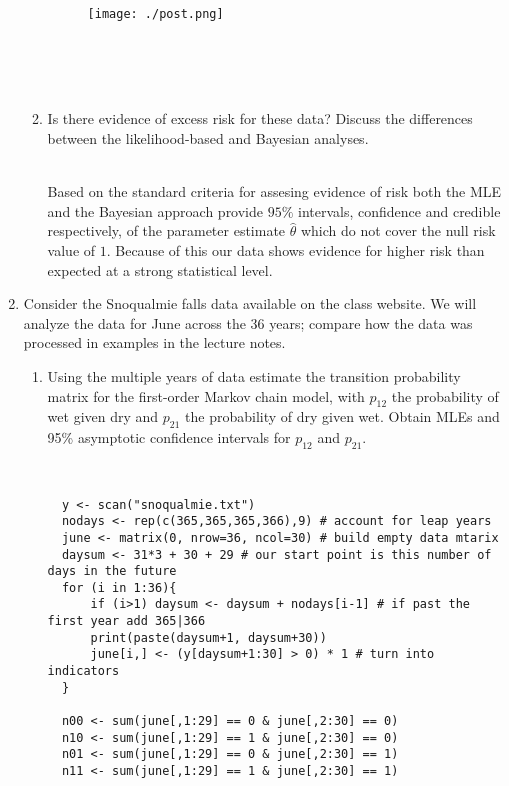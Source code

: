 \documentclass{article} %
\begin{document}
\begin{enumerate}
\begin{enumerate}
\begin{figure}[h!t]
\centerline{
	\texttt{[image: ./post.png]}
}
\end{figure}

~ \\
~ \\
~ \\

\item Is there evidence of excess risk for these data? Discuss the differences between the likelihood-based and Bayesian analyses.

~ \\
Based on the standard criteria for assesing evidence of risk both the MLE and
the Bayesian approach provide $95\%$ intervals, confidence and credible respectively,
of the parameter estimate $\hat{\theta}$ which do not cover the null risk value
of $1$. Because of this our data shows evidence for higher risk than
expected at a strong statistical level.

\end{enumerate}
\item Consider the Snoqualmie falls data available on the class
  website.
  We will analyze the
  data for June across the 36 years; compare how the data was
  processed in examples in the lecture notes.
\begin{enumerate}
\item Using the multiple years of data estimate the transition
  probability matrix for the first-order Markov chain model, with
  $p_{12}$
  the probability of wet given dry and $p_{21}$
  the probability of dry given wet.  Obtain MLEs and 95\% asymptotic
  confidence intervals for $p_{12}$ and $p_{21}$.

~ \\

\begin{lstlisting}
  y <- scan("snoqualmie.txt")
  nodays <- rep(c(365,365,365,366),9) # account for leap years
  june <- matrix(0, nrow=36, ncol=30) # build empty data mtarix
  daysum <- 31*3 + 30 + 29 # our start point is this number of days in the future
  for (i in 1:36){
      if (i>1) daysum <- daysum + nodays[i-1] # if past the first year add 365|366
      print(paste(daysum+1, daysum+30))
      june[i,] <- (y[daysum+1:30] > 0) * 1 # turn into indicators
  }

  n00 <- sum(june[,1:29] == 0 & june[,2:30] == 0)
  n10 <- sum(june[,1:29] == 1 & june[,2:30] == 0)
  n01 <- sum(june[,1:29] == 0 & june[,2:30] == 1)
  n11 <- sum(june[,1:29] == 1 & june[,2:30] == 1)


\end{lstlisting}
\end{enumerate}
\end{enumerate}
\end{document}
